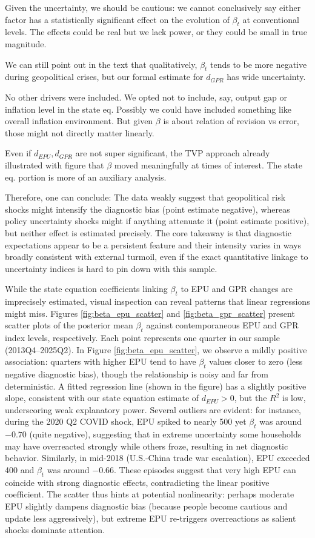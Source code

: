 \documentclass[12pt]{article}
\begin{document}
Given the uncertainty, we should be cautious: we cannot conclusively say either factor has a statistically significant effect on the evolution of $\beta_t$ at conventional levels. The effects could be real but we lack power, or they could be small in true magnitude.

We can still point out in the text that qualitatively, $\beta_t$ tends to be more negative during geopolitical crises, but our formal estimate for $d_{GPR}$ has wide uncertainty.

No other drivers were included. We opted not to include, say, output gap or inflation level in the state eq. Possibly we could have included something like overall inflation environment. But given $\beta$ is about relation of revision vs error, those might not directly matter linearly.

Even if $d_{EPU}, d_{GPR}$ are not super significant, the TVP approach already illustrated with figure that $\beta$ moved meaningfully at times of interest. The state eq. portion is more of an auxiliary analysis.

Therefore, one can conclude: The data weakly suggest that geopolitical risk shocks might intensify the diagnostic bias (point estimate negative), whereas policy uncertainty shocks might if anything attenuate it (point estimate positive), but neither effect is estimated precisely. The core takeaway is that diagnostic expectations appear to be a persistent feature and their intensity varies in ways broadly consistent with external turmoil, even if the exact quantitative linkage to uncertainty indices is hard to pin down with this sample.

While the state equation coefficients linking $\beta_t$ to EPU and GPR changes are imprecisely estimated, visual inspection can reveal patterns that linear regressions might miss. Figures \ref{fig:beta_epu_scatter} and \ref{fig:beta_gpr_scatter} present scatter plots of the posterior mean $\beta_t$ against contemporaneous EPU and GPR index levels, respectively. Each point represents one quarter in our sample (2013Q4--2025Q2). In Figure \ref{fig:beta_epu_scatter}, we observe a mildly positive association: quarters with higher EPU tend to have $\beta_t$ values closer to zero (less negative diagnostic bias), though the relationship is noisy and far from deterministic. A fitted regression line (shown in the figure) has a slightly positive slope, consistent with our state equation estimate of $d_{EPU}>0$, but the $R^2$ is low, underscoring weak explanatory power. Several outliers are evident: for instance, during the 2020 Q2 COVID shock, EPU spiked to nearly 500 yet $\beta_t$ was around $-0.70$ (quite negative), suggesting that in extreme uncertainty some households may have overreacted strongly while others froze, resulting in net diagnostic behavior. Similarly, in mid-2018 (U.S.-China trade war escalation), EPU exceeded 400 and $\beta_t$ was around $-0.66$. These episodes suggest that very high EPU can coincide with strong diagnostic effects, contradicting the linear positive coefficient. The scatter thus hints at potential nonlinearity: perhaps moderate EPU slightly dampens diagnostic bias (because people become cautious and update less aggressively), but extreme EPU re-triggers overreactions as salient shocks dominate attention.
\end{document}
